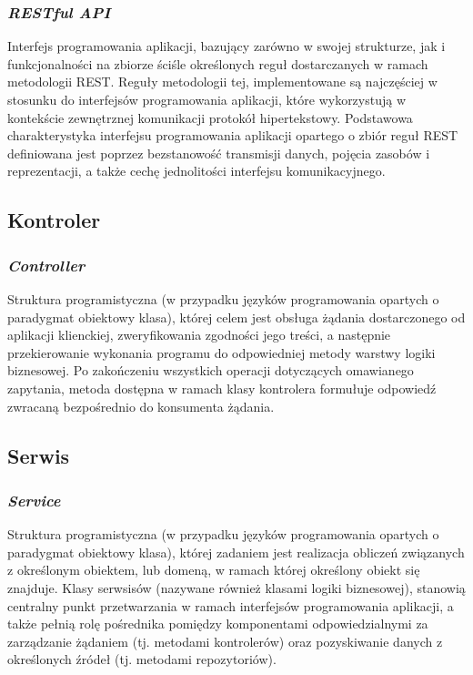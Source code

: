 \subsubsection{\textit{RESTful API}}
Interfejs programowania aplikacji, bazujący zarówno w swojej strukturze, jak i funkcjonalności na zbiorze ściśle określonych reguł dostarczanych w ramach metodologii REST. Reguły metodologii tej, implementowane są najczęściej w stosunku do interfejsów programowania aplikacji, które wykorzystują w kontekście zewnętrznej komunikacji protokół hipertekstowy. Podstawowa charakterystyka interfejsu programowania aplikacji opartego o zbiór reguł REST definiowana jest poprzez bezstanowość transmisji danych, pojęcia zasobów i reprezentacji, a także cechę jednolitości interfejsu komunikacyjnego.

\subsection*{Kontroler}
\subsubsection{\textit{Controller}}
Struktura programistyczna (w przypadku języków programowania opartych o paradygmat obiektowy klasa), której celem jest obsługa żądania dostarczonego od aplikacji klienckiej, zweryfikowania zgodności jego treści, a następnie przekierowanie wykonania programu do odpowiedniej metody warstwy logiki biznesowej.
Po zakończeniu wszystkich operacji dotyczących omawianego zapytania, metoda dostępna w ramach klasy kontrolera formułuje odpowiedź zwracaną bezpośrednio do konsumenta żądania.

\subsection*{Serwis}
\subsubsection{\textit{Service}}
Struktura programistyczna (w przypadku języków programowania opartych o paradygmat obiektowy klasa), której zadaniem jest realizacja obliczeń związanych z określonym obiektem, lub domeną, w ramach której określony obiekt się znajduje. Klasy serwsisów (nazywane również klasami logiki biznesowej), stanowią centralny punkt przetwarzania w ramach interfejsów programowania aplikacji, a także pełnią rolę pośrednika pomiędzy komponentami odpowiedzialnymi za zarządzanie żądaniem (tj. metodami kontrolerów) oraz pozyskiwanie danych z określonych źródeł (tj. metodami repozytoriów).


